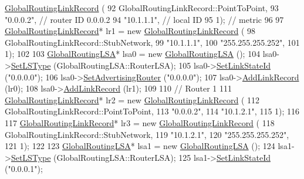 \begin{DoxyCode}
      \hyperlink{classns3_1_1GlobalRoutingLinkRecord}{GlobalRoutingLinkRecord} (
92       GlobalRoutingLinkRecord::PointToPoint,
93       \textcolor{stringliteral}{"0.0.0.2"}, \textcolor{comment}{// router ID 0.0.0.2}
94       \textcolor{stringliteral}{"10.1.1.1"}, \textcolor{comment}{// local ID}
95       1);       \textcolor{comment}{// metric}
96 
97   \hyperlink{classns3_1_1GlobalRoutingLinkRecord}{GlobalRoutingLinkRecord}* lr1 = \textcolor{keyword}{new} 
      \hyperlink{classns3_1_1GlobalRoutingLinkRecord}{GlobalRoutingLinkRecord} (
98       GlobalRoutingLinkRecord::StubNetwork,
99       \textcolor{stringliteral}{"10.1.1.1"},
100       \textcolor{stringliteral}{"255.255.255.252"},
101       1);
102 
103   \hyperlink{classns3_1_1GlobalRoutingLSA}{GlobalRoutingLSA}* lsa0 = \textcolor{keyword}{new} \hyperlink{classns3_1_1GlobalRoutingLSA}{GlobalRoutingLSA} ();
104   lsa0->\hyperlink{classns3_1_1GlobalRoutingLSA_a8f68a559296813ae47d5cabc5f566ddb}{SetLSType} (GlobalRoutingLSA::RouterLSA);
105   lsa0->\hyperlink{classns3_1_1GlobalRoutingLSA_af31bd5b6ff2fe784f3df4e5b921b4081}{SetLinkStateId} (\textcolor{stringliteral}{"0.0.0.0"});
106   lsa0->\hyperlink{classns3_1_1GlobalRoutingLSA_a97f6a00183d783cef4afb54c2216fa2f}{SetAdvertisingRouter} (\textcolor{stringliteral}{"0.0.0.0"});
107   lsa0->\hyperlink{classns3_1_1GlobalRoutingLSA_a2b2bdf9b121a61fe793c88ab216f4fb9}{AddLinkRecord} (lr0);
108   lsa0->\hyperlink{classns3_1_1GlobalRoutingLSA_a2b2bdf9b121a61fe793c88ab216f4fb9}{AddLinkRecord} (lr1);
109 
110   \textcolor{comment}{// Router 1}
111   \hyperlink{classns3_1_1GlobalRoutingLinkRecord}{GlobalRoutingLinkRecord}* lr2 = \textcolor{keyword}{new} 
      \hyperlink{classns3_1_1GlobalRoutingLinkRecord}{GlobalRoutingLinkRecord} (
112       GlobalRoutingLinkRecord::PointToPoint,
113       \textcolor{stringliteral}{"0.0.0.2"},
114       \textcolor{stringliteral}{"10.1.2.1"},
115       1);
116 
117   \hyperlink{classns3_1_1GlobalRoutingLinkRecord}{GlobalRoutingLinkRecord}* lr3 = \textcolor{keyword}{new} 
      \hyperlink{classns3_1_1GlobalRoutingLinkRecord}{GlobalRoutingLinkRecord} (
118       GlobalRoutingLinkRecord::StubNetwork,
119       \textcolor{stringliteral}{"10.1.2.1"},
120       \textcolor{stringliteral}{"255.255.255.252"},
121       1);
122 
123   \hyperlink{classns3_1_1GlobalRoutingLSA}{GlobalRoutingLSA}* lsa1 = \textcolor{keyword}{new} \hyperlink{classns3_1_1GlobalRoutingLSA}{GlobalRoutingLSA} ();
124   lsa1->\hyperlink{classns3_1_1GlobalRoutingLSA_a8f68a559296813ae47d5cabc5f566ddb}{SetLSType} (GlobalRoutingLSA::RouterLSA);
125   lsa1->\hyperlink{classns3_1_1GlobalRoutingLSA_af31bd5b6ff2fe784f3df4e5b921b4081}{SetLinkStateId} (\textcolor{stringliteral}{"0.0.0.1"});

\end{DoxyCode}
